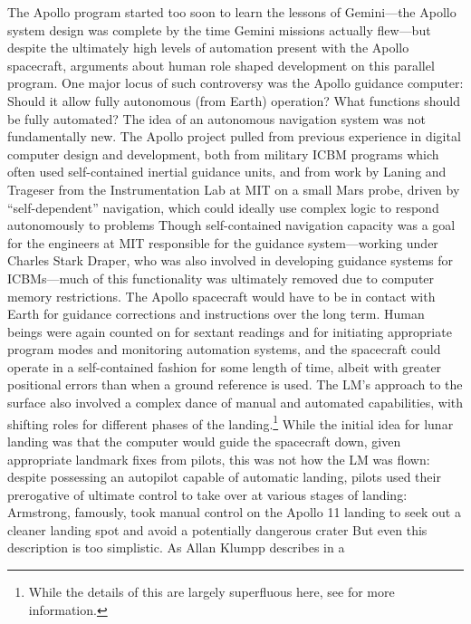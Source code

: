 The Apollo program started too soon to learn the lessons of
Gemini---the Apollo system design was complete by the time Gemini
missions actually flew\cite[p. 93]{???-DM}---but despite the
ultimately high levels of automation present with the Apollo
spacecraft, arguments about human role shaped development on this
parallel program. One major locus of such controversy was the Apollo
guidance computer: Should it allow fully autonomous (from Earth)
operation? What functions should be fully automated? The idea of an
autonomous navigation system was not fundamentally new. The Apollo
project pulled from previous experience in digital computer design and
development, both from military ICBM programs which often used
self-contained inertial guidance units, and from work by Laning and
Trageser from the Instrumentation Lab at MIT on a small Mars probe,
driven by ``self-dependent'' navigation, which could ideally use
complex logic to respond autonomously to problems\cite[p.
  99-100]{???-DM} Though self-contained navigation capacity was a goal
for the engineers at MIT responsible for the guidance system---working
under Charles Stark Draper, who was also involved in developing
guidance systems for ICBMs---much of this functionality was ultimately
removed due to computer memory restrictions\cite{???}. The Apollo
spacecraft would have to be in contact with Earth for guidance
corrections and instructions over the long term. Human beings were
again counted on for sextant readings and for initiating appropriate
program modes and monitoring automation systems,\cite{???} and the spacecraft
could operate in a self-contained fashion for some length of
time, albeit with greater positional errors than when a ground
reference is used\cite[p. 191]{???-BennettCheatham}. The LM's approach
to the surface also involved a complex dance of manual and automated
capabilities, with shifting roles for different phases of the
landing.\footnote{While the details of this are largely superfluous
  here, see \cite{???-BennettCheatham} for more information.} While the initial
idea for lunar landing was that the 
computer would guide the spacecraft down, given appropriate landmark
fixes from pilots, this was not how the LM was flown: despite
possessing an autopilot capable of automatic landing, pilots used
their prerogative of ultimate control to take over at various stages
of landing: Armstrong, famously, took manual control on the Apollo 11
landing to seek out a cleaner landing spot and avoid a potentially
dangerous crater\cite[p. 3]{???-DM} But even this description is too
simplistic. As Allan Klumpp describes in a
